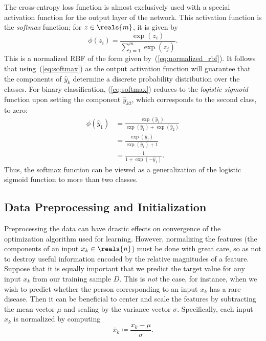 \documentclass[11pt,a4paper]{article}
\numberwithin{equation}{section}
\begin{document}
The cross-entropy loss function is almost exclusively used with a special
activation function for the output layer of the network. This activation
function is the \emph{softmax} function; for $z \in \reals{m}$, it is given by
\begin{equation}
	\phi(z_i) = \frac{\exp(z_i)}{\sum_{j = 1}^m \exp(z_j)}.
	\label{eq:softmax}
\end{equation}
This is a normalized RBF of the form given by~(\ref{eq:normalized_rbf}). It
follows that using~(\ref{eq:softmax}) as the output activation function will
guarantee that the components of $\hat{y}_k$ determine a discrete probability
distribution over the classes. For binary classification, (\ref{eq:softmax})
reduces to the \emph{logistic sigmoid} function upon setting the component
$\hat{y}_{k2}$, which corresponds to the second class, to zero:
\begin{align*}
	\phi(\hat{y}_1)
	&= \frac{\exp(\hat{y}_1)}{\exp(\hat{y}_1) + \exp(\hat{y}_2)} \\
	&= \frac{\exp(\hat{y}_1)}{\exp(\hat{y}_1) + 1} \\
	&= \frac{1}{1 + \exp(-\hat{y}_1)}.
\end{align*}
Thus, the softmax function can be viewed as a generalization of the logistic
sigmoid function to more than two classes.

\subsection{Data Preprocessing and Initialization}
\label{sec:pp_and_init}

Preprocessing the data can have drastic effects on convergence of the
optimization algorithm used for learning. However, normalizing the features (the
components of an input $x_k \in \reals{n}$) must be done with great care, so as
not to destroy useful information encoded by the relative magnitudes of a
feature. Suppose that it is equally important that we predict the target value
for any input $x_k$ from our training sample $D$. This is \emph{not} the case,
for instance, when we wish to predict whether the person corresponding to an
input $x_k$ has a rare disease. Then it can be beneficial to center and scale
the features by subtracting the mean vector $\mu$ and scaling by the variance
vector $\sigma$. Specifically, each input $x_k$ is normalized by computing
\begin{equation}
	\bar{x}_k \coloneqq \frac{x_k - \mu}{\sigma}.
	\label{eq:center_and_scale}
\end{equation}
\end{document}
